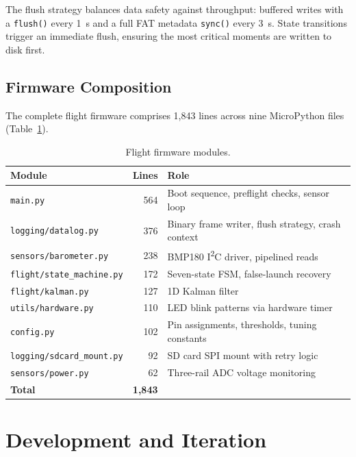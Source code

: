 \documentclass[11pt, a4paper]{article}
\begin{document}
The flush strategy balances data safety against throughput: buffered writes with a \texttt{flush()} every \SI{1}{\second} and a full FAT metadata \texttt{sync()} every \SI{3}{\second}. State transitions trigger an immediate flush, ensuring the most critical moments are written to disk first.

\figFlightProfile

\subsection{Firmware Composition}

The complete flight firmware comprises 1,843 lines across nine MicroPython files (Table~\ref{tab:firmware}).

\begin{table}[h]
\centering
\small
\caption{Flight firmware modules.}
\label{tab:firmware}
\begin{tabularx}{\textwidth}{l r X}
\toprule
\textbf{Module} & \textbf{Lines} & \textbf{Role} \\
\midrule
\texttt{main.py}                & 564 & Boot sequence, preflight checks, sensor loop \\
\texttt{logging/datalog.py}     & 376 & Binary frame writer, flush strategy, crash context \\
\texttt{sensors/barometer.py}   & 238 & BMP180 I\textsuperscript{2}C driver, pipelined reads \\
\texttt{flight/state\_machine.py} & 172 & Seven-state FSM, false-launch recovery \\
\texttt{flight/kalman.py}       & 127 & 1D Kalman filter \\
\texttt{utils/hardware.py}      & 110 & LED blink patterns via hardware timer \\
\texttt{config.py}              & 102 & Pin assignments, thresholds, tuning constants \\
\texttt{logging/sdcard\_mount.py} & 92 & SD card SPI mount with retry logic \\
\texttt{sensors/power.py}       & 62  & Three-rail ADC voltage monitoring \\
\midrule
\textbf{Total}                  & \textbf{1,843} & \\
\bottomrule
\end{tabularx}
\end{table}

\section{Development and Iteration}
\end{document}
